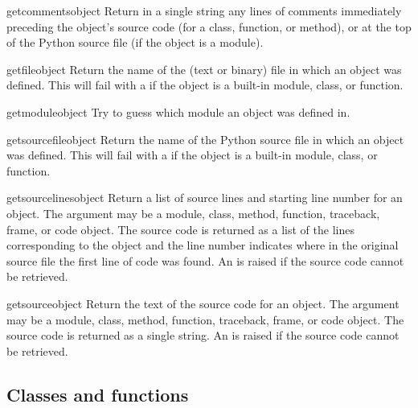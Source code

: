 \begin{funcdesc}{getcomments}{object}
  Return in a single string any lines of comments immediately preceding
  the object's source code (for a class, function, or method), or at the
  top of the Python source file (if the object is a module).
\end{funcdesc}

\begin{funcdesc}{getfile}{object}
  Return the name of the (text or binary) file in which an object was
  defined.  This will fail with a  if the object
  is a built-in module, class, or function.
\end{funcdesc}

\begin{funcdesc}{getmodule}{object}
  Try to guess which module an object was defined in.
\end{funcdesc}

\begin{funcdesc}{getsourcefile}{object}
  Return the name of the Python source file in which an object was
  defined.  This will fail with a  if the object
  is a built-in module, class, or function.
\end{funcdesc}

\begin{funcdesc}{getsourcelines}{object}
  Return a list of source lines and starting line number for an object.
  The argument may be a module, class, method, function, traceback, frame,
  or code object.  The source code is returned as a list of the lines
  corresponding to the object and the line number indicates where in the
  original source file the first line of code was found.  An
   is raised if the source code cannot be retrieved.
\end{funcdesc}

\begin{funcdesc}{getsource}{object}
  Return the text of the source code for an object.
  The argument may be a module, class, method, function, traceback, frame,
  or code object.  The source code is returned as a single string.  An
   is raised if the source code cannot be retrieved.
\end{funcdesc}

\subsection{Classes and functions
            \label{inspect-classes-functions}}

